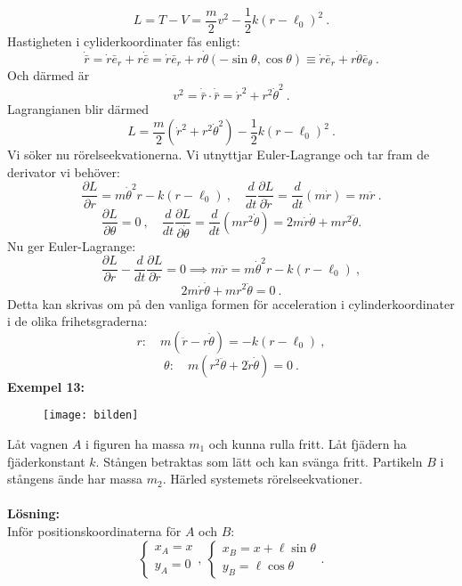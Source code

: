 \documentclass{article}
\begin{document}
$$
L=T-V=\frac{m}{2}v^2-\frac{1}{2}k(r-\ell_0)^2 \ .
$$
Hastigheten i cyliderkoordinater fås enligt:
$$
\dot{\bar{r}}=\dot{r}\bar{e}_r+r\dot{\bar{e}}=\dot{r}\bar{e}_r+r\dot{\theta}(-\sin\theta,\cos\theta)\equiv\dot{r}\bar{e}_r+r\dot{\theta}\bar{e}_{\theta} \ .
$$
Och därmed är
$$
v^2=\dot{\bar{r}}\cdot\dot{\bar{r}}=\dot{r}^2+r^2\dot{\theta}^2 \ .
$$
Lagrangianen blir därmed 
$$
L=\frac{m}{2}(\dot{r}^2+r^2\dot{\theta}^2)-\frac{1}{2}k(r-\ell_0)^2 \ .
$$
Vi söker nu rörelseekvationerna. Vi utnyttjar Euler-Lagrange och tar fram de derivator vi behöver:
$$
\frac{\partial L}{\partial r}=m\dot{\theta}^2r-k(r-\ell_0) \ , \quad \frac{d}{dt}\frac{\partial L}{\partial\dot{r}}=\frac{d}{dt}(m\dot{r})=m\ddot{r} \ .
$$
$$
\frac{\partial L}{\partial \theta}=0 \ , \quad \frac{d}{dt}\frac{\partial L}{\partial\dot{\theta}}=\frac{d}{dt}(mr^2\dot{\theta})=2m\dot{r}\dot{\theta}+mr^2\ddot{\theta} .
$$
Nu ger Euler-Lagrange:
$$
\frac{\partial L}{\partial r}-\frac{d}{dt}\frac{\partial L}{\partial\dot{r}}=0 \implies m\ddot{r}=m\dot{\theta}^2r-k(r-\ell_0) \ ,
$$
$$
2m\dot{r}\dot{\theta}+mr^2\ddot{\theta} =0 \ .
$$
Detta kan skrivas om på den vanliga formen för acceleration i cylinderkoordinater i de olika frihetsgraderna:
$$
r: \quad m(\ddot{r}-r\dot{\theta})=-k(r-\ell_0) \ ,
$$
$$
\theta: \quad m(r^2\ddot{\theta}+2\dot{r}\dot{\theta})=0 \ .
$$
\newpage
\noindent
\textbf{Exempel 13:}
\begin{figure}[H]
\begin{center} 
\texttt{[image: bilden]}
\caption{}
\label{fig:fig1}
\end{center}
\end{figure}
Låt vagnen $A$ i figuren ha massa $m_1$ och kunna rulla fritt. Låt fjädern ha fjäderkonstant $k$. Stången betraktas som lätt och kan svänga fritt. Partikeln $B$ i stångens ände har massa $m_2$. Härled systemets rörelseekvationer.\\ \\
\textbf{Lösning:}\\
Inför positionskoordinaterna för $A$ och $B$:
\begin{equation*}
    \begin{cases}
        x_A=x\\
        y_A=0
    \end{cases}, \ 
    \begin{cases}
      x_B=x+\ell\sin\theta\\
      y_B=\ell\cos\theta
    \end{cases}.
\end{equation*}
\end{document}
